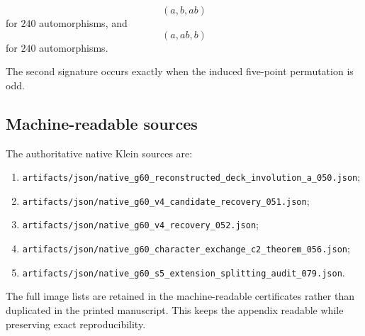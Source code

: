 \[
(a,b,ab)
\]
for \(240\) automorphisms, and
\[
(a,ab,b)
\]
for \(240\) automorphisms.

The second signature occurs exactly when the induced five-point
permutation is odd.

\subsection{Machine-readable sources}

The authoritative native Klein sources are:

\begin{enumerate}
    \item
    \texttt{artifacts/json/native\_g60\_reconstructed\_deck\_involution\_a\_050.json};

    \item
    \texttt{artifacts/json/native\_g60\_v4\_candidate\_recovery\_051.json};

    \item
    \texttt{artifacts/json/native\_g60\_v4\_recovery\_052.json};

    \item
    \texttt{artifacts/json/native\_g60\_character\_exchange\_c2\_theorem\_056.json};

    \item
    \texttt{artifacts/json/native\_g60\_s5\_extension\_splitting\_audit\_079.json}.
\end{enumerate}

The full image lists are retained in the machine-readable certificates
rather than duplicated in the printed manuscript. This keeps the
appendix readable while preserving exact reproducibility.
